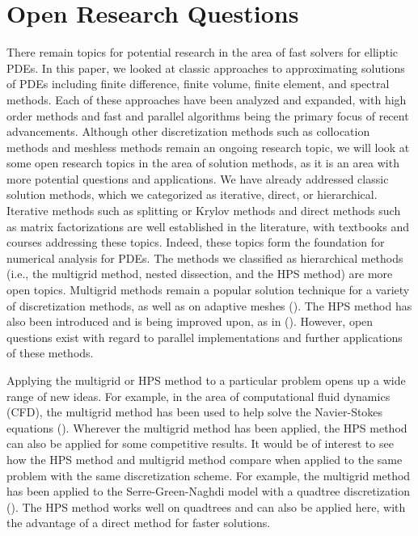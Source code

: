 \section{Open Research Questions}
\label{sec:open}

There remain topics for potential research in the area of fast solvers for elliptic PDEs. In this paper, we looked at classic approaches to approximating solutions of PDEs including finite difference, finite volume, finite element, and spectral methods. Each of these approaches have been analyzed and expanded, with high order methods and fast and parallel algorithms being the primary focus of recent advancements. Although other discretization methods such as collocation methods and meshless methods remain an ongoing research topic, we will look at some open research topics in the area of solution methods, as it is an area with more potential questions and applications. We have already addressed classic solution methods, which we categorized as iterative, direct, or hierarchical. Iterative methods such as splitting or Krylov methods and direct methods such as matrix factorizations are well established in the literature, with textbooks and courses addressing these topics. Indeed, these topics form the foundation for numerical analysis for PDEs. The methods we classified as hierarchical methods (i.e., the multigrid method, nested dissection, and the HPS method) are more open topics. Multigrid methods remain a popular solution technique for a variety of discretization methods, as well as on adaptive meshes (\citep{babich2010adaptive,thompson1989adaptive}). The HPS method has also been introduced and is being improved upon, as in (\citep{fortunato2020ultraspherical,geldermans2019adaptive,gillman2014direct,martinsson2015hierarchical}). However, open questions exist with regard to parallel implementations and further applications of these methods.

Applying the multigrid or HPS method to a particular problem opens up a wide range of new ideas. For example, in the area of computational fluid dynamics (CFD), the multigrid method has been used to help solve the Navier-Stokes equations (\citep{babich2010adaptive}). Wherever the multigrid method has been applied, the HPS method can also be applied for some competitive results. It would be of interest to see how the HPS method and multigrid method compare when applied to the same problem with the same discretization scheme. For example, the multigrid method has been applied to the Serre-Green-Naghdi model with a quadtree discretization (\citep{popinet2015quadtree}). The HPS method works well on quadtrees and can also be applied here, with the advantage of a direct method for faster solutions.

